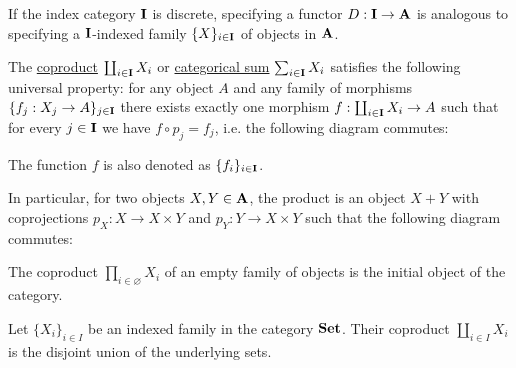 \begin{definition}\label{def:categorical_sum}\cite[definition 5.2.2]{Leinster2014}
  If the index category $\operatorname{\mathbf{I}}$ is discrete, specifying a functor $D: \operatorname{\mathbf{I}} \to \operatorname{\mathbf{A}}$ is analogous to specifying a $\operatorname{\mathbf{I}}$-indexed family $\{ X \}_{i \in \operatorname{\mathbf{I}}}$ of objects in $\operatorname{\mathbf{A}}$.

  The \uline{coproduct} $\coprod_{i \in \operatorname{\mathbf{I}}} X_i$ or \uline{categorical sum} $\sum_{i \in \operatorname{\mathbf{I}}} X_i$ satisfies the following universal property: for any object $A$ and any family of morphisms $\{ f_j: {X_j} \to A \}_{j \in \operatorname{\mathbf{I}}}$ there exists exactly one morphism $f: \coprod_{i \in \operatorname{\mathbf{I}}} X_i \to A$ such that for every $j \in \operatorname{\mathbf{I}}$ we have $f \circ p_j = f_j$, i.e. the following diagram commutes:
  \begin{center}
  \end{center}

  The function $f$ is also denoted as $\{ f_i \}_{i \in \operatorname{\mathbf{I}}}$.

  In particular, for two objects $X, Y \in \operatorname{\mathbf{A}}$, the product is an object $X + Y$ with coprojections $p_X: X \to X \times Y$ and $p_Y: Y \to X \times Y$ such that the following diagram commutes:
  \begin{center}
  \end{center}
\end{definition}

\begin{note}\label{note:categorical_coproduct_of_empty_family}
  The coproduct $\prod_{i \in \varnothing} X_i$ of an empty family of objects is the initial object of the category.
\end{note}

\begin{example}\label{ex:categorical_coproduct/set}
  Let $\{ X_i \}_{i \in I}$ be an indexed family in the category $\operatorname{\mathbf{Set}}$. Their coproduct $\coprod_{i \in I} X_i$ is the disjoint union of the underlying sets.
\end{example}

